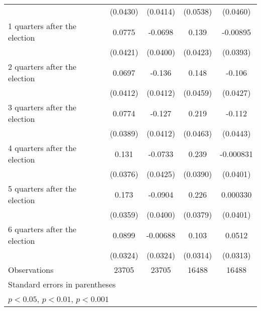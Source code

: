 \begin{table}[htbp]
\begin{tabular}{l*{4}{c}}
                    &    (0.0430)         &    (0.0414)         &    (0.0538)         &    (0.0460)         \\
[1em]
 1 quarters after the election&      0.0775         &     -0.0698         &       0.139\sym{***}&    -0.00895         \\
                    &    (0.0421)         &    (0.0400)         &    (0.0423)         &    (0.0393)         \\
[1em]
 2 quarters after the election&      0.0697         &      -0.136\sym{***}&       0.148\sym{**} &      -0.106\sym{*}  \\
                    &    (0.0412)         &    (0.0412)         &    (0.0459)         &    (0.0427)         \\
[1em]
 3 quarters after the election&      0.0774\sym{*}  &      -0.127\sym{**} &       0.219\sym{***}&      -0.112\sym{*}  \\
                    &    (0.0389)         &    (0.0412)         &    (0.0463)         &    (0.0443)         \\
[1em]
 4 quarters after the election&       0.131\sym{***}&     -0.0733         &       0.239\sym{***}&   -0.000831         \\
                    &    (0.0376)         &    (0.0425)         &    (0.0390)         &    (0.0401)         \\
[1em]
 5 quarters after the election&       0.173\sym{***}&     -0.0904\sym{*}  &       0.226\sym{***}&    0.000330         \\
                    &    (0.0359)         &    (0.0400)         &    (0.0379)         &    (0.0401)         \\
[1em]
 6 quarters after the election&      0.0899\sym{**} &    -0.00688         &       0.103\sym{**} &      0.0512         \\
                    &    (0.0324)         &    (0.0324)         &    (0.0314)         &    (0.0313)         \\
\hline
Observations        &       23705         &       23705         &       16488         &       16488         \\
\hline\hline
\multicolumn{5}{l}{\footnotesize Standard errors in parentheses}\\
\multicolumn{5}{l}{\footnotesize \sym{*} \(p<0.05\), \sym{**} \(p<0.01\), \sym{***} \(p<0.001\)}\\
\end{tabular}
\end{table}
